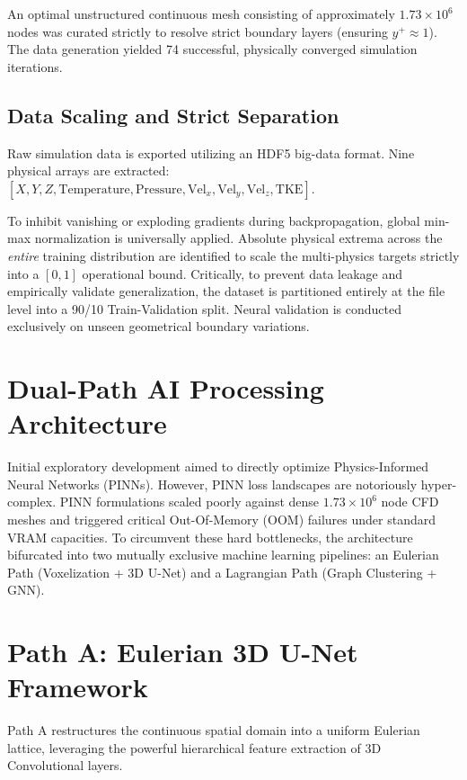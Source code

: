 \documentclass[conference]{IEEEtran}
\begin{document}
An optimal unstructured continuous mesh consisting of approximately $1.73 \times 10^6$ nodes was curated strictly to resolve strict boundary layers (ensuring $y^+ \approx 1$). The data generation yielded 74 successful, physically converged simulation iterations. 

\subsection{Data Scaling and Strict Separation}
Raw simulation data is exported utilizing an HDF5 big-data format. Nine physical arrays are extracted: $[X, Y, Z, \text{Temperature}, \text{Pressure}, \text{Vel}_x, \text{Vel}_y, \text{Vel}_z, \text{TKE}]$.

To inhibit vanishing or exploding gradients during backpropagation, global min-max normalization is universally applied. Absolute physical extrema across the \textit{entire} training distribution are identified to scale the multi-physics targets strictly into a $[0, 1]$ operational bound. Critically, to prevent data leakage and empirically validate generalization, the dataset is partitioned entirely at the file level into a 90/10 Train-Validation split. Neural validation is conducted exclusively on unseen geometrical boundary variations.

\section{Dual-Path AI Processing Architecture}
Initial exploratory development aimed to directly optimize Physics-Informed Neural Networks (PINNs). However, PINN loss landscapes are notoriously hyper-complex. PINN formulations scaled poorly against dense $1.73\times 10^6$ node CFD meshes and triggered critical Out-Of-Memory (OOM) failures under standard VRAM capacities. To circumvent these hard bottlenecks, the architecture bifurcated into two mutually exclusive machine learning pipelines: an Eulerian Path (Voxelization + 3D U-Net) and a Lagrangian Path (Graph Clustering + GNN).

\section{Path A: Eulerian 3D U-Net Framework}
Path A restructures the continuous spatial domain into a uniform Eulerian lattice, leveraging the powerful hierarchical feature extraction of 3D Convolutional layers.
\end{document}
